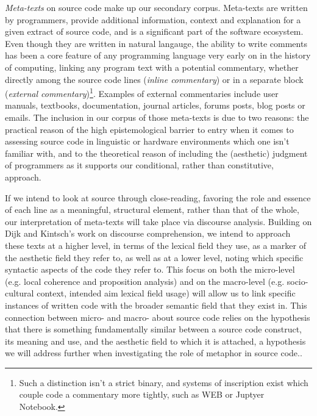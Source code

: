 \emph{Meta-texts} on source code make up our secondary corpus. Meta-texts are written by programmers, provide additional information, context and explanation for a given extract of source code, and is a significant part of the software ecosystem. Even though they are written in natural langauge, the ability to write comments has been a core feature of any programming language very early on in the history of computing, linking any program text with a potential commentary, whether directly among the source code lines (\emph{inline commentary}) or in a separate block (\emph{external commentary})\footnote{Such a distinction isn't a strict binary, and systems of inscription exist which couple code a commentary more tightly, such as WEB or Juptyer Notebook.}. Examples of external commentaries include user manuals, textbooks, documentation, journal articles, forums posts, blog posts or emails. The inclusion in our corpus of those meta-texts is due to two reasons: the practical reason of the high epistemological barrier to entry when it comes to assessing source code in linguistic or hardware environments which one isn't familiar with, and to the theoretical reason of including the (aesthetic) judgment of programmers as it supports our conditional, rather than constitutive, approach.

If we intend to look at source through close-reading, favoring the role and essence of each line as a meaningful, structural element, rather than that of the whole, our interpretation of meta-texts will take place via discourse analysis. Building on Dijk and Kintsch's work on discourse comprehension\cite{dijk_strategies_1983}, we intend to approach these texts at a higher level, in terms of the lexical field they use, as a marker of the aesthetic field they refer to, as well as at a lower level, noting which specific syntactic aspects of the code they refer to. This focus on both the micro-level (e.g. local coherence and proposition analysis) and on the macro-level (e.g. socio-cultural context, intended aim  lexical field usage) will allow us to link specific instances of written code with the broader semantic field that they exist in. This connection between micro- and macro- about source code relies on the hypothesis that there is something fundamentally similar between a source code construct, its meaning and use, and the aesthetic field to which it is attached, a hypothesis we will address further when investigating the role of metaphor in source code..

